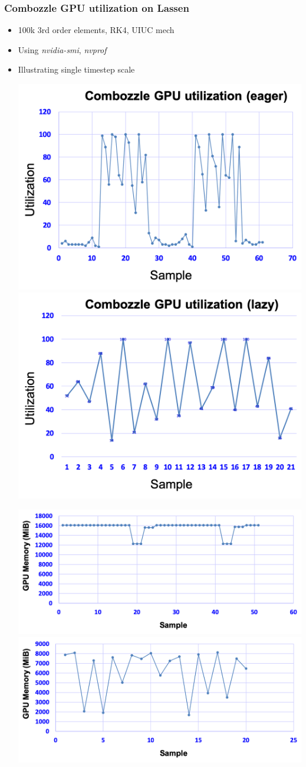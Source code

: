 \begin{frame}\frametitle{Combozzle GPU utilization on Lassen}
\begin{itemize}
\item 100k 3rd order elements, RK4, UIUC mech
\item Using \textit{nvidia-smi}, \textit{nvprof}
\item Illustrating single timestep scale
\begin{minipage}{1.0\textwidth}
\hspace{-15pt}\includegraphics[width=.45\textwidth]{figures/GPUtilizationEager2.png} 
\includegraphics[width=.45\textwidth]{figures/GPUtilizationLazy2.png}
  \end{minipage}
\begin{minipage}{1.0\textwidth}
\hspace{-15pt}\includegraphics[width=.45\textwidth]{figures/GPUMemEager.png} 
\includegraphics[width=.45\textwidth]{figures/GPUMemLazy.png}

\end{minipage}
\end{itemize}
\end{frame}
